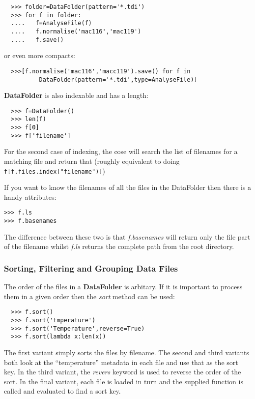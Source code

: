 \documentclass[a4paper,11pt]{scrartcl}
\begin{document}
\begin{verbatim}
  >>> folder=DataFolder(pattern='*.tdi')
  >>> for f in folder:
  ....   f=AnalyseFile(f)
  ....   f.normalise('mac116','mac119')
  ....   f.save()
\end{verbatim}

or even more compacts:

\begin{verbatim}
  >>>[f.normalise('mac116','macc119').save() for f in
          DataFolder(pattern='*.tdi',type=AnalyseFile)]
\end{verbatim}

\textbf{DataFolder} is also indexable and has a length:

\begin{verbatim}
  >>> f=DataFolder()
  >>> len(f)
  >>> f[0]
  >>> f['filename']
\end{verbatim}

For the second case of indexing, the cose will search the list of filenames for a matching file and return that (roughly equivalent to doing \verb#f[f.files.index("filename")]#)

If you want to know the filenames of all the files in the DataFolder then there is a handy attributes:
\begin{verbatim}
>>> f.ls
>>> f.basenames
\end{verbatim}

The difference between these two is that \textit{f.basenames} will return only the file part of the filename whilst \textit{f.ls} returns the complete path from the root directory.

\subsubsection{Sorting, Filtering and Grouping Data Files}

The order of the files in a \textbf{DataFolder} is arbitary. If it is important to process them in a given order then the \textit{sort} method can be used:

\begin{verbatim}
  >>> f.sort()
  >>> f.sort('tmperature')
  >>> f.sort('Temperature',reverse=True)
  >>> f.sort(lambda x:len(x))
\end{verbatim}

The first variant simply sorts the files by filename. The second and third variants both look at the ``temperature'' metadata in each file and use that as the sort key. In the third variant, the \textit{revers} keyword is used to reverse the order of the sort. In the final variant, each file is loaded in turn and the supplied function is called and evaluated to find a sort key.
\end{document}
